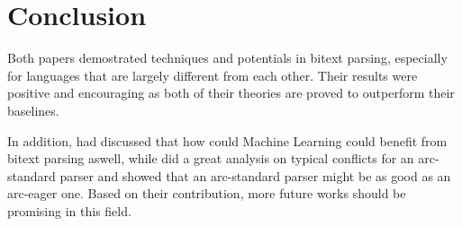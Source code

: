\documentclass[11pt]{article} %
\begin{document}
\section{Conclusion}

Both papers demostrated techniques and potentials in bitext parsing, especially for languages that are largely different from each other. Their results were positive and encouraging as both of their theories are proved to outperform their baselines.

In addition, \cite{Burkett:2008:TLB:1613715.1613828} had discussed that how could Machine Learning could benefit from bitext parsing aswell, while \cite{Huang:2009:BSP:1699648.1699668} did a great analysis on typical conflicts for an arc-standard parser and showed that an arc-standard parser might be as good as an arc-eager one. Based on their contribution, more future works should be promising in this field.



\end{document}
